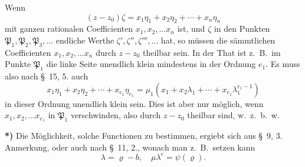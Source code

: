 \documentclass{article}
\begin{document}
Wenn
\[ (z-z_{0})\zeta = x_{1}\eta_{1} + x_{2}\eta_{2} + \cdots + x_{n}\eta_{n} \]
mit ganzen rationalen Coefficienten $x_{1}, x_{2}, \ldots x_{n}$ ist, und $\zeta$ in den Punkten $\mathfrak{P}_{1}, \mathfrak{P}_{2}, \mathfrak{P}_{3}, \ldots$ endliche Werthe $\zeta', \zeta'', \zeta''', \ldots$ hat, so müssen die sämmtlichen Coefficienten $x_{1}, x_{2}, \ldots x_{n}$ durch $z-z_{0}$ theilbar sein. In der That ist z.\ B.\ im Punkte $\mathfrak{P}_{1}$ die linke Seite unendlich klein mindestens in der Ordnung $e_{1}$. Es muss also nach §~15, 5. auch
\[ x_{1}\eta_{1} + x_{2}\eta_{2} + \cdots + x_{e_{1}}\eta_{e_{1}} = \mu_{1}(x_{1} + x_{2}\lambda_{1} + \cdots + x_{e_{1}}\lambda_{1}^{e_{1}-1}) \]
in dieser Ordnung unendlich klein sein. Dies ist aber nur möglich, wenn $x_{1}, x_{2}, \ldots x_{e_{1}}$ in $\mathfrak{P}_{1}$ verschwinden, also durch $z-z_{0}$ theilbar sind, w.\ z.\ b.\ w.

\textbf{*)} Die Möglichkeit, solche Functionen zu bestimmen, ergiebt sich aus §~9, 3. Anmerkung, oder auch nach §~11, 2., wonach man z.\ B.\ setzen kann
\[ \lambda = \varrho - b, \quad \mu\lambda^{e} = \psi(\varrho). \]

\end{document}
